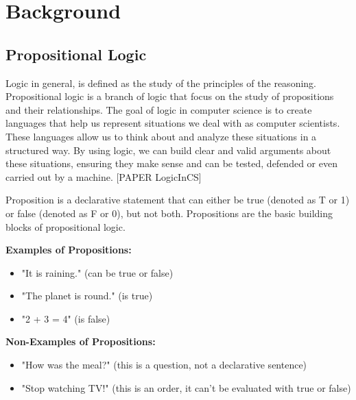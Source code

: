 
%

\chapter{Background}

\section{Propositional Logic}
\label{chap:prop}
Logic in general, is defined as the study of the principles of the reasoning. Propositional logic is a branch of logic that focus on the study of propositions and their relationships. The goal of logic in computer science is to create languages that help us represent situations we deal with as computer scientists. These languages allow us to think about and analyze these situations in a structured way. By using logic, we can build clear and valid arguments about these situations, ensuring they make sense and can be tested, defended or even carried out by a machine. [PAPER LogicInCS]

Proposition is a declarative statement that can either be true (denoted as T or 1) or false (denoted as F or 0), but not both. Propositions are the basic building blocks of propositional logic. 

\textbf{Examples of Propositions:}
\begin{itemize}
    \item "It is raining." (can be true or false)
    \item "The planet is round." (is true)
    \item "2 + 3 = 4" (is false)
\end{itemize}

\textbf{Non-Examples of Propositions:}
\begin{itemize}
    \item "How was the meal?" (this is a question, not a declarative sentence)
    \item "Stop watching TV!" (this is an order, it can't be evaluated with true or false)
\end{itemize}

